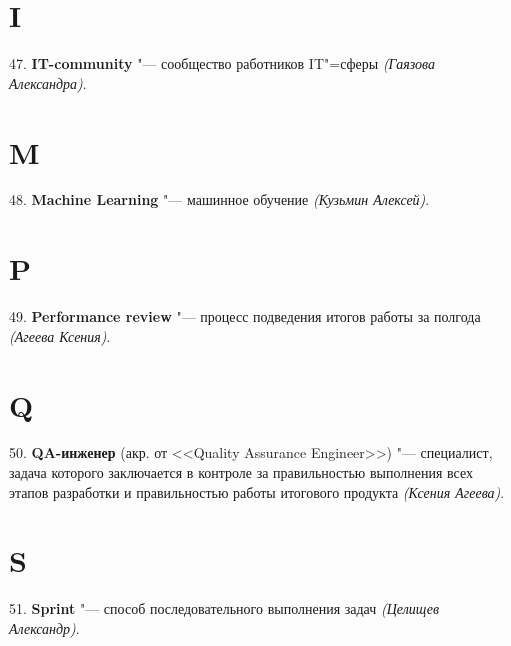 \documentclass{article}
\begin{document}
\section*{I}

\hspace{0.33cm} 47. \textbf{IT-community} "--- сообщество работников IT"=сферы \textit{(Гаязова
Александра)}.

\section*{M}

\hspace{0.33cm} 48. \textbf{Machine Learning} "--- машинное обучение \textit{(Кузьмин Алексей)}.

\section*{P}

\hspace{0.33cm} 49. \textbf{Performance review} "--- процесс подведения итогов работы за полгода
\textit{(Агеева Ксения)}.

\section*{Q}

\hspace{0.33cm} 50. \textbf{QA-инженер} (акр. от <<Quality Assurance Engineer>>)
"--- специалист, задача которого заключается в контроле за правильностью
выполнения всех этапов разработки и правильностью работы итогового продукта
\textit{(Ксения Агеева)}.

\section*{S}

\hspace{0.33cm} 51. \textbf{Sprint} "--- способ последовательного выполнения задач
\textit{(Целищев Александр)}.
\end{document}
